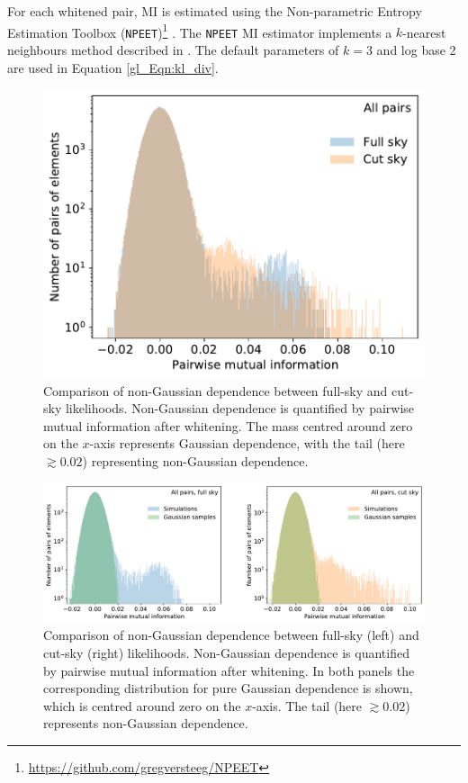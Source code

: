 For each whitened pair, MI is estimated using the Non-parametric Entropy Estimation Toolbox (\texttt{NPEET})\footnote{\url{https://github.com/gregversteeg/NPEET}} \citep{VerSteeg2014}. The \texttt{NPEET} MI estimator implements a $k$-nearest neighbours method described in \citet{Kraskov2004}. The default parameters of $k = 3$ and log base 2 are used in Equation \eqref{gl_Eqn:kl_div}.

\begin{figure}
\centering
\includegraphics[width=.5\textwidth]{mi_all}
\caption{Comparison of non-Gaussian dependence between full-sky and cut-sky likelihoods. Non-Gaussian dependence is quantified by pairwise mutual information after whitening. The mass centred around zero on the $x$-axis represents Gaussian dependence, with the tail (here $\gtrsim 0.02$) representing non-Gaussian dependence.}
\label{gl_Fig:mi_all}
\end{figure}

\begin{figure}
\centering
\includegraphics[width=\textwidth]{mi_vs_gauss}
\caption{Comparison of non-Gaussian dependence between full-sky (left) and cut-sky (right) likelihoods. Non-Gaussian dependence is quantified by pairwise mutual information after whitening. In both panels the corresponding distribution for pure Gaussian dependence is shown, which is centred around zero on the $x$-axis. The tail (here $\gtrsim 0.02$) represents non-Gaussian dependence.}
\label{gl_Fig:mi_vs_gauss}
\end{figure}

